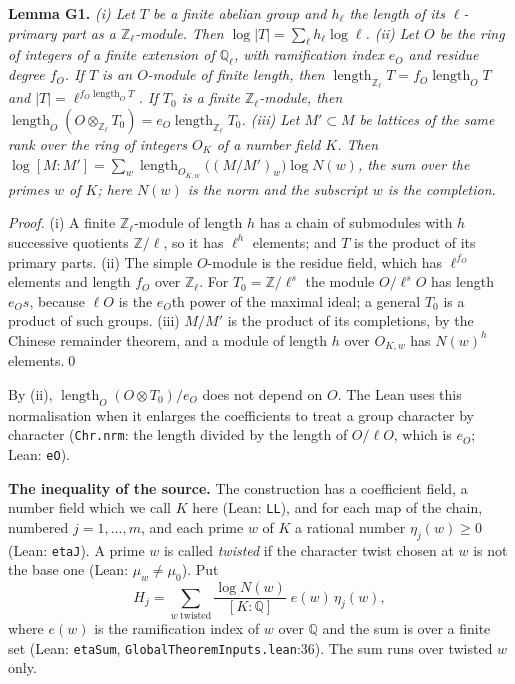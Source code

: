 \documentclass[11pt,letterpaper]{article}
\newcommand{\Z}{\mathbb Z}\newcommand{\Q}{\mathbb Q}\newcommand{\C}{\mathbb C}
\begin{document}
\textbf{Lemma G1.} \emph{\textup{(i)} Let $T$ be a finite abelian group and $h_\ell$ the length of its
$\ell$-primary part as a $\Z_\ell$-module. Then $\log|T|=\sum_\ell h_\ell\log\ell$.
\textup{(ii)} Let $O$ be the ring of integers of a finite extension of $\Q_\ell$, with ramification index
$e_O$ and residue degree $f_O$. If $T$ is an $O$-module of finite length, then
$\operatorname{length}_{\Z_\ell}T=f_O\operatorname{length}_OT$ and $|T|=\ell^{f_O\operatorname{length}_OT}$.
If $T_0$ is a finite $\Z_\ell$-module, then $\operatorname{length}_O(O\otimes_{\Z_\ell}T_0)=e_O\operatorname{length}_{\Z_\ell}T_0$.
\textup{(iii)} Let $M'\subset M$ be lattices of the same rank over the ring of integers $O_K$ of a number
field $K$. Then
$\log[M:M']=\sum_w\operatorname{length}_{O_{K,w}}\big((M/M')_w\big)\log N(w)$,
the sum over the primes $w$ of $K$; here $N(w)$ is the norm and the subscript $w$ is the completion.}

\emph{Proof.} (i) A finite $\Z_\ell$-module of length $h$ has a chain of submodules with $h$ successive
quotients $\Z/\ell$, so it has $\ell^{h}$ elements; and $T$ is the product of its primary parts. (ii) The
simple $O$-module is the residue field, which has $\ell^{f_O}$ elements and length $f_O$ over $\Z_\ell$.
For $T_0=\Z/\ell^{s}$ the module $O/\ell^{s}O$ has length $e_Os$, because $\ell O$ is the $e_O$th power of the
maximal ideal; a general $T_0$ is a product of such groups. (iii) $M/M'$ is the product of its completions,
by the Chinese remainder theorem, and a module of length $h$ over $O_{K,w}$ has $N(w)^{h}$ elements.\qed

By (ii), $\operatorname{length}_O(O\otimes T_0)/e_O$ does not depend on $O$. The Lean uses this normalisation
when it enlarges the coefficients to treat a group character by character (\texttt{Chr.nrm}: the length
divided by the length of $O/\ell O$, which is $e_O$; Lean: \texttt{eO}).

\textbf{The inequality of the source.} The construction has a coefficient field, a number field which we
call $K$ here (Lean: \texttt{LL}), and for each map of the chain, numbered $j=1,\dots,m$, and each prime $w$ of
$K$ a rational number $\eta_j(w)\ge0$ (Lean: \texttt{etaJ}). A prime $w$ is called \emph{twisted} if the
character twist chosen at $w$ is not the base one (Lean: $\mu_w\ne\mu_0$). Put
\begin{equation}\label{gc:eta}
 H_j=\sum_{w\ \mathrm{twisted}}\frac{\log N(w)}{[K:\Q]}\;e(w)\,\eta_j(w),
\end{equation}
where $e(w)$ is the ramification index of $w$ over $\Q$ and the sum is over a finite set (Lean:
\texttt{etaSum}, \texttt{GlobalTheoremInputs.lean}:36). The sum runs over twisted $w$ only.
\end{document}
